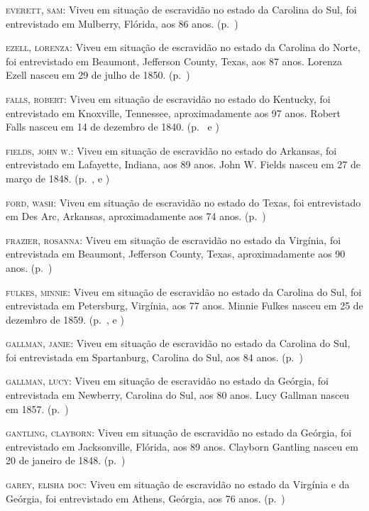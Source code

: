 \begin{Parskip}
\textsc{everett, sam:} Viveu em situação de escravidão no estado da Carolina do Sul, foi
entrevistado em Mulberry, Flórida, aos 86 anos. (p.~\pageref{ref85})

\textsc{ezell, lorenza:} Viveu em situação de escravidão no estado da Carolina do Norte, foi
entrevistado em Beaumont, Jefferson County, Texas, aos 87 anos. Lorenza
Ezell nasceu em 29 de julho de 1850. (p.~\pageref{ref86})

\textsc{falls, robert:} Viveu em situação de escravidão no estado do Kentucky, foi entrevistado
em Knoxville, Tennessee, aproximadamente aos 97 anos. Robert Falls
nasceu em 14 de dezembro de 1840. (p.~\pageref{ref87} e \pageref{ref88})

\textsc{fields, john w.:} Viveu em situação de escravidão no estado do Arkansas, foi
entrevistado em Lafayette, Indiana, aos 89 anos. John W. Fields nasceu
em 27 de março de 1848. (p.~\pageref{ref89}, \pageref{ref90} e \pageref{ref91})

\textsc{ford, wash:} Viveu em situação de escravidão no estado do Texas, foi entrevistado em Des
Arc, Arkansas, aproximadamente aos 74 anos. (p.~\pageref{ref92})

\textsc{frazier, rosanna:} Viveu em situação de escravidão no estado da Virgínia, foi
entrevistada em Beaumont, Jefferson County, Texas, aproximadamente aos
90 anos. (p.~\pageref{ref93})

\textsc{fulkes, minnie:} Viveu em situação de escravidão no estado da Carolina do Sul, foi
entrevistada em Petersburg, Virgínia, aos 77 anos. Minnie Fulkes nasceu
em 25 de dezembro de 1859. (p.~\pageref{ref94}, \pageref{ref95} e \pageref{ref96})

\textsc{gallman, janie:} Viveu em situação de escravidão no estado da Carolina do Sul, foi
entrevistada em Spartanburg, Carolina do Sul, aos 84 anos. (p.~\pageref{ref97})

\textsc{gallman, lucy:} Viveu em situação de escravidão no estado da Geórgia, foi entrevistada
em Newberry, Carolina do Sul, aos 80 anos. Lucy Gallman nasceu em 1857. (p.~\pageref{ref98})

\textsc{gantling, clayborn:} Viveu em situação de escravidão no estado da Geórgia, foi
entrevistado em Jacksonville, Flórida, aos 89 anos. Clayborn Gantling
nasceu em 20 de janeiro de 1848. (p.~\pageref{ref99})

\textsc{garey, elisha doc:} Viveu em situação de escravidão no estado da Virgínia e da Geórgia,
foi entrevistado em Athens, Geórgia, aos 76 anos. (p.~\pageref{ref100})


\end{Parskip}
